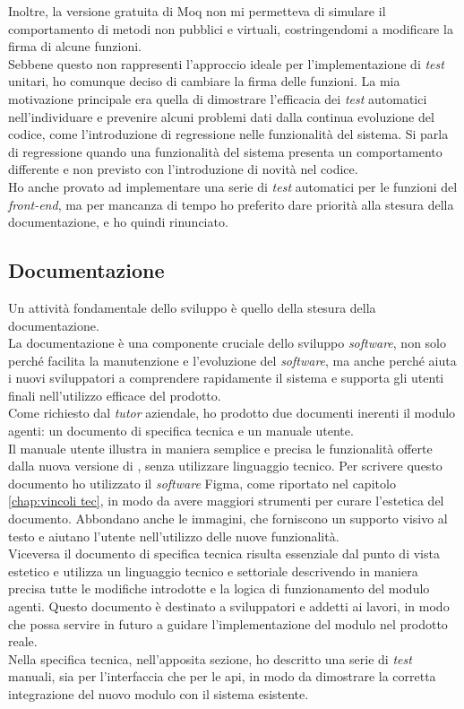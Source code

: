 Inoltre, la versione gratuita di Moq non mi permetteva di simulare il comportamento di metodi non pubblici 
e virtuali, costringendomi a modificare la firma di alcune funzioni.\\
Sebbene questo non rappresenti l'approccio ideale per l'implementazione di \textit{test} unitari, ho comunque deciso di 
cambiare la firma delle funzioni. La mia motivazione principale era quella di dimostrare l'efficacia dei \textit{test} 
automatici nell'individuare e prevenire alcuni problemi dati dalla continua evoluzione del codice, come 
l'introduzione di regressione nelle funzionalità del sistema. Si parla di regressione quando una funzionalità del 
sistema presenta un comportamento differente e non previsto con l'introduzione di novità nel codice.\\
Ho anche provato ad implementare una serie di \textit{test} automatici per le funzioni del \textit{front-end}, ma per mancanza 
di tempo ho preferito dare priorità alla stesura della documentazione, e ho quindi rinunciato.\\

\subsection{Documentazione}
Un attività fondamentale dello sviluppo è quello della stesura della documentazione.\\
La documentazione è una componente cruciale dello sviluppo \textit{software}, non solo perché facilita la manutenzione 
e l'evoluzione del \textit{software}, ma anche perché aiuta i nuovi sviluppatori a comprendere rapidamente il sistema 
e supporta gli utenti finali nell'utilizzo efficace del prodotto.\\
Come richiesto dal \textit{tutor} aziendale, ho prodotto due documenti inerenti il modulo agenti: un documento di 
specifica tecnica e un manuale utente.\\
Il manuale utente illustra in maniera semplice e precisa le funzionalità offerte dalla nuova versione di {\movi}, 
senza utilizzare linguaggio tecnico. Per scrivere questo documento ho utilizzato il \textit{software} Figma, come 
riportato nel capitolo \ref{chap:vincoli tec}, in modo da avere maggiori strumenti per curare l'estetica del documento. 
Abbondano anche le immagini, che forniscono un supporto visivo al testo e aiutano l'utente nell'utilizzo delle nuove 
funzionalità.\\
Viceversa il documento di specifica tecnica risulta essenziale dal punto di vista estetico e utilizza un linguaggio 
tecnico e settoriale descrivendo in maniera precisa tutte le modifiche introdotte e la logica di funzionamento 
del modulo agenti. Questo documento è destinato a sviluppatori e addetti ai lavori, in modo che possa servire in 
futuro a guidare l'implementazione del modulo nel prodotto reale.\\
Nella specifica tecnica, nell'apposita sezione, ho descritto una serie di \textit{test} manuali, sia per l'interfaccia 
che per le \gls{api}, in modo da dimostrare la corretta integrazione del nuovo modulo con il sistema esistente.